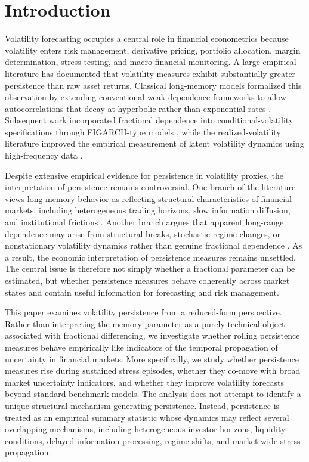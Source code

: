 \documentclass[jrfm,article,submit,moreauthors,pdftex]{Definitions/mdpi}
\begin{document}
\section{Introduction}
\label{sec:intro}

Volatility forecasting occupies a central role in financial econometrics
because volatility enters risk management, derivative pricing, portfolio
allocation, margin determination, stress testing, and macro-financial
monitoring. A large empirical literature has documented that volatility
measures exhibit substantially greater persistence than raw asset returns.
Classical long-memory models formalized this observation by extending
conventional weak-dependence frameworks to allow autocorrelations that
decay at hyperbolic rather than exponential rates
\citep{granger1980introduction,hosking1981fractional}. Subsequent work
incorporated fractional dependence into conditional-volatility specifications
through FIGARCH-type models \citep{baillie1996fractionally}, while the
realized-volatility literature improved the empirical measurement of latent
volatility dynamics using high-frequency data
\citep{andersen2003modeling,barndorff2002econometric}.

Despite extensive empirical evidence for persistence in volatility proxies,
the interpretation of persistence remains controversial. One branch of the
literature views long-memory behavior as reflecting structural
characteristics of financial markets, including heterogeneous trading
horizons, slow information diffusion, and institutional frictions
\citep{muller1997volatilities}. Another branch argues that apparent
long-range dependence may arise from structural breaks, stochastic regime
changes, or nonstationary volatility dynamics rather than genuine fractional
dependence \citep{mikosch2004nonstationarities}. As a result, the economic
interpretation of persistence measures remains unsettled. The central issue
is therefore not simply whether a fractional parameter can be estimated, but
whether persistence measures behave coherently across market states and
contain useful information for forecasting and risk management.

This paper examines volatility persistence from a reduced-form perspective.
Rather than interpreting the memory parameter as a purely technical object
associated with fractional differencing, we investigate whether rolling
persistence measures behave empirically like indicators of the temporal
propagation of uncertainty in financial markets. More specifically, we study
whether persistence measures rise during sustained stress episodes, whether
they co-move with broad market uncertainty indicators, and whether they
improve volatility forecasts beyond standard benchmark models. The analysis
does not attempt to identify a unique structural mechanism generating
persistence. Instead, persistence is treated as an empirical summary
statistic whose dynamics may reflect several overlapping mechanisms,
including heterogeneous investor horizons, liquidity conditions, delayed
information processing, regime shifts, and market-wide stress propagation.
\end{document}
